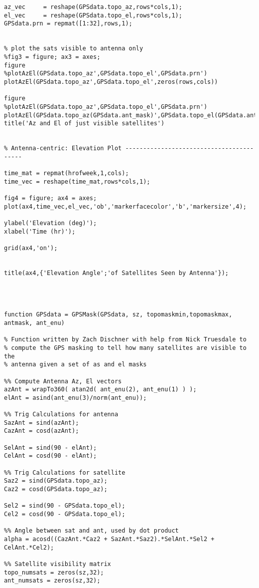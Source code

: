 \documentclass[12pt,a4paper,oneside]{article}
\begin{document}
\begin{appendix}
\begin{lstlisting}
az_vec     = reshape(GPSdata.topo_az,rows*cols,1);
el_vec     = reshape(GPSdata.topo_el,rows*cols,1);
GPSdata.prn = repmat([1:32],rows,1);


% plot the sats visible to antenna only
%fig3 = figure; ax3 = axes;
figure
%plotAzEl(GPSdata.topo_az',GPSdata.topo_el',GPSdata.prn')
plotAzEl(GPSdata.topo_az',GPSdata.topo_el',zeros(rows,cols))

figure
%plotAzEl(GPSdata.topo_az',GPSdata.topo_el',GPSdata.prn')
plotAzEl(GPSdata.topo_az(GPSdata.ant_mask)',GPSdata.topo_el(GPSdata.ant_mask)',zeros(rows,cols))
title('Az and El of just visible satellites')


% Antenna-centric: Elevation Plot -----------------------------------------

time_mat = repmat(hrofweek,1,cols);
time_vec = reshape(time_mat,rows*cols,1);

fig4 = figure; ax4 = axes;
plot(ax4,time_vec,el_vec,'ob','markerfacecolor','b','markersize',4);

ylabel('Elevation (deg)');
xlabel('Time (hr)');

grid(ax4,'on');


title(ax4,{'Elevation Angle';'of Satellites Seen by Antenna'});




function GPSdata = GPSMask(GPSdata, sz, topomaskmin,topomaskmax, antmask, ant_enu)

% Function written by Zach Dischner with help from Nick Truesdale to
% compute the GPS masking to tell how many satellites are visible to the
% antenna given a set of as and el masks

%% Compute Antenna Az, El vectors
azAnt = wrapTo360( atan2d( ant_enu(2), ant_enu(1) ) );
elAnt = asind(ant_enu(3)/norm(ant_enu));

%% Trig Calculations for antenna
SazAnt = sind(azAnt);
CazAnt = cosd(azAnt);

SelAnt = sind(90 - elAnt);
CelAnt = cosd(90 - elAnt);

%% Trig Calculations for satellite
Saz2 = sind(GPSdata.topo_az);
Caz2 = cosd(GPSdata.topo_az);

Sel2 = sind(90 - GPSdata.topo_el);
Cel2 = cosd(90 - GPSdata.topo_el);

%% Angle between sat and ant, used by dot product
alpha = acosd((CazAnt.*Caz2 + SazAnt.*Saz2).*SelAnt.*Sel2 + CelAnt.*Cel2);

%% Satellite visibility matrix
topo_numsats = zeros(sz,32);
ant_numsats = zeros(sz,32);


\end{lstlisting}
\end{appendix}
\end{document}
